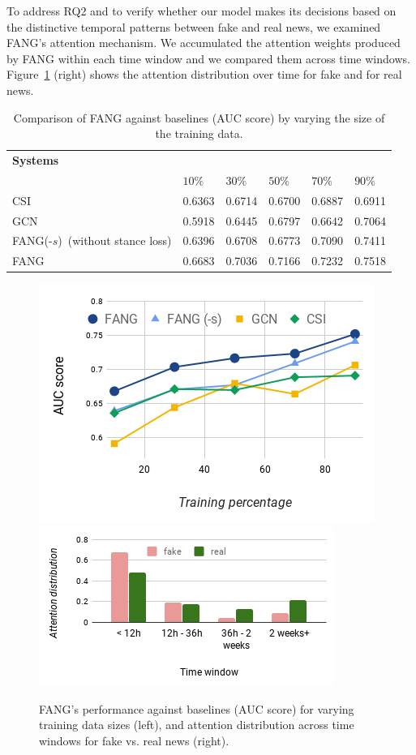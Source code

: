 \documentclass[sigconf]{acmart}
\theoremstyle{definition}
\theoremstyle{hypothesis}
\begin{document}
To address RQ2 and to verify whether our model makes its decisions based on the distinctive temporal patterns between fake and real news, we examined FANG's attention mechanism. We accumulated the attention weights produced by FANG within each time window and we compared them across time windows. Figure~\ref{fig:limited_and_attention} (right) shows the attention distribution over time for fake and for real news. 
\begin{table}[t]
    \centering
    \small
    \caption{Comparison of FANG against baselines (AUC score) by varying the size of the training data.}
    \begin{tabular}{l  l l l l l} 
    \toprule
        \bf Systems & \multicolumn{5}{c}{\centering{\bf AUC score at different training percentages}} \\
         & \bf $10\%$ & \bf $30\%$ & \bf $50\%$ & \bf $70\%$ & \bf $90\%$ \\
    \midrule
        CSI & 0.6363  & 0.6714  & 0.6700 & 0.6887 & 0.6911 \\
        GCN & 0.5918 & 0.6445  & 0.6797 & 0.6642 & 0.7064 \\
        FANG(-$s$)~\tiny{(without stance loss)} & 0.6396 & 0.6708 & 0.6773 & 0.7090 & 0.7411 \\ \hline
        FANG & 0.6683 & 0.7036 & 0.7166 & 0.7232 & 0.7518 \\ 
    \bottomrule
    \end{tabular}
    \label{table:limited_data}
\end{table}

\begin{figure}[t]
\centering
\includegraphics[scale=0.25]{limited.png}
\includegraphics[scale=0.35]{attention.png}
\caption{FANG's performance against baselines (AUC score) for varying training data sizes (left), and attention distribution across time windows for fake vs. real news (right).}
\label{fig:limited_and_attention}
\end{figure}
\end{document}

